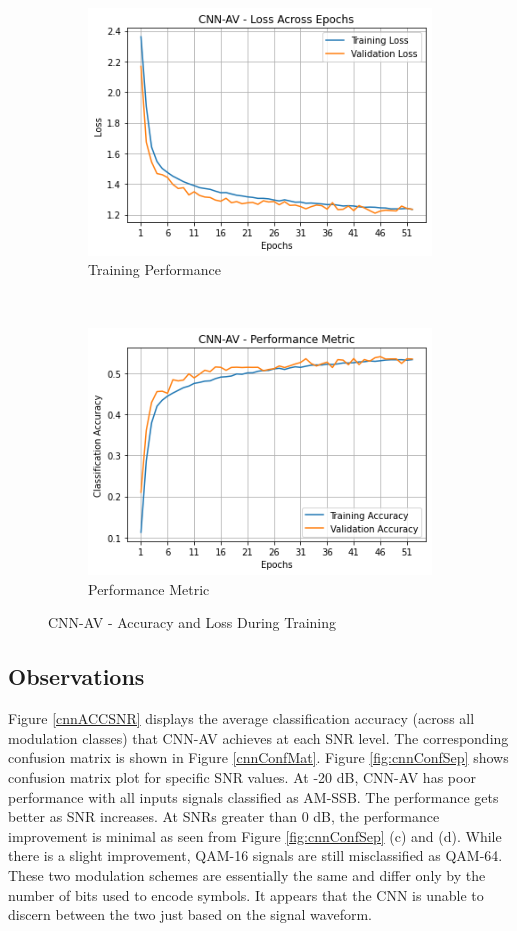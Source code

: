 \documentclass[journal,onecolumn]{IEEEtran}
\begin{document}
\begin{figure}[h]
    \centering
    \begin{subfigure}[b]{0.4\textwidth}
        \centering
        \includegraphics[scale=0.5]{cnnavPerf}
        \caption{Training Performance}
    \end{subfigure}%
    ~ 
    \begin{subfigure}[b]{0.4\textwidth}
        \centering
        \includegraphics[scale=0.5]{cnnavPerfMet}
        \caption{Performance Metric}
    \end{subfigure}
    \caption{CNN-AV - Accuracy and Loss During Training}
    \label{fig:performanceCNN}
\end{figure}

\subsection{Observations}

Figure \ref{cnnACCSNR} displays the average classification accuracy (across all modulation classes) that CNN-AV achieves at each SNR level. The corresponding confusion matrix is shown in Figure \ref{cnnConfMat}. Figure \ref{fig:cnnConfSep} shows confusion matrix plot for specific SNR values. At -20 dB, CNN-AV has poor performance with all inputs signals classified as AM-SSB. The performance gets better as SNR increases. At SNRs greater than 0 dB, the performance improvement is minimal as seen from Figure \ref{fig:cnnConfSep} (c) and (d). While there is a slight improvement, QAM-16 signals are still misclassified as QAM-64. These two modulation schemes are essentially the same and differ only by the number of bits used to encode symbols. It appears that the CNN is unable to discern between the two just based on the signal waveform.
\end{document}
